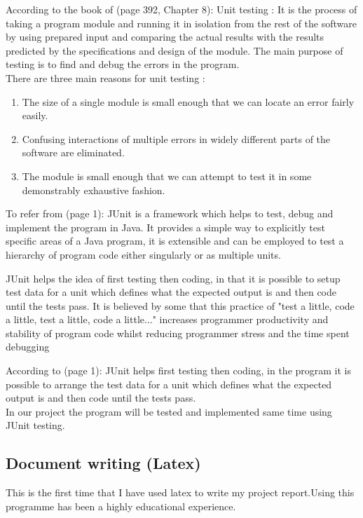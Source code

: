 \documentclass{report}
\begin{document}
According to the book of \cite{Jones1990SoftwareEngineering}(page 392, Chapter 8): Unit testing : It is the process of taking a program module and running it in isolation from the rest of the software by using prepared input and comparing the actual results with the results  predicted by the specifications and design of the module. The main purpose of testing is to find and debug the errors in the program.\\
There are three main reasons for unit testing :
\begin{enumerate}
\item The size of a single module is small enough that we can locate an error fairly easily.
\item Confusing interactions of multiple errors in widely different parts of the software are eliminated.
\item The module is small enough that we can attempt to test it in some demonstrably exhaustive fashion.
\end{enumerate}
To refer from \cite{JUnitTestingUtilityTutorial}(page 1): JUnit is a framework which helps to test, debug and implement the program in Java. It provides a simple way to explicitly test specific areas of a Java program, it is extensible and can be employed to test a hierarchy of program code either singularly or as multiple units.

JUnit helps the idea of first testing then coding, in that it is possible to setup test data for a unit which defines what the expected output is and then code until the tests pass. It is believed by some that this practice of "test a little, code a little, test a little, code a little..." increases programmer productivity and stability of program code whilst reducing programmer stress and the time spent debugging

According to \cite{JUnitTestingUtilityTutorial}(page 1): JUnit helps first testing then coding, in the program it is possible to arrange the test data for a unit which defines what the expected output is and then code until the tests pass.\\
In our project the program will be tested and implemented same time using JUnit testing.  


\subsection{Document writing (Latex)}
\label{sec:latex}

This is the first time that I have used latex to write my project report.Using this programme has been a highly educational experience. 
\end{document}
